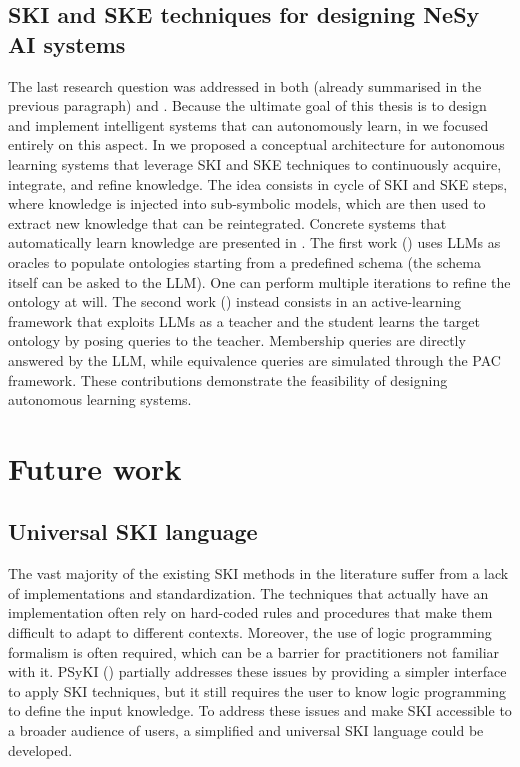 \subsection*{\gls{SKI} and \gls{SKE} techniques for designing \gls{NeSy} \gls{AI} systems}
%
The last research question  was addressed in both  (already summarised in the previous paragraph) and .
%
Because the ultimate goal of this thesis is to design and implement intelligent systems that can autonomously learn, in  we focused entirely on this aspect.
%
In  we proposed a conceptual architecture for autonomous learning systems that leverage \gls{SKI} and \gls{SKE} techniques to continuously acquire, integrate, and refine knowledge.
%
The idea consists in cycle of \gls{SKI} and \gls{SKE} steps, where knowledge is injected into sub-symbolic models, which are then used to extract new knowledge that can be reintegrated.
%
Concrete systems that automatically learn knowledge are presented in .
%
The first work () uses \glspl{LLM} as oracles to populate ontologies starting from a predefined schema (the schema itself can be asked to the \gls{LLM}).
%
One can perform multiple iterations to refine the ontology at will.
%
The second work () instead consists in an active-learning framework that exploits \glspl{LLM} as a teacher and the student learns the target ontology by posing queries to the teacher.
%
Membership queries are directly answered by the \gls{LLM}, while equivalence queries are simulated through the \gls{PAC} framework.
%
These contributions demonstrate the feasibility of designing autonomous learning systems.



\section{Future work}\label{sec:future-work}

\subsection*{Universal \gls{SKI} language}
%
The vast majority of the existing \gls{SKI} methods in the literature suffer from a lack of implementations and standardization.
%
The techniques that actually have an implementation often rely on hard-coded rules and procedures that make them difficult to adapt to different contexts.
%
Moreover, the use of logic programming formalism is often required, which can be a barrier for practitioners not familiar with it.
%
\Gls{PSyKI} () partially addresses these issues by providing a simpler interface to apply \gls{SKI} techniques, but it still requires the user to know logic programming to define the input knowledge.
%
To address these issues and make \gls{SKI} accessible to a broader audience of users, a simplified and universal \gls{SKI} language could be developed.


